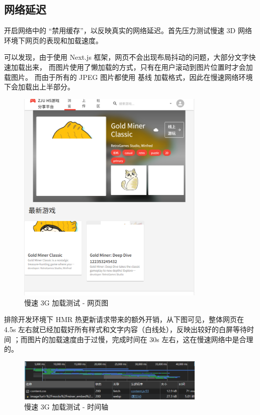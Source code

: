 \documentclass[12pt]{ctexart} %
\begin{document}
\subsection{网络延迟}

开启网络中的 “禁用缓存”，以反映真实的网络延迟。首先压力测试慢速 3D 网络环境下网页的表现和加载速度。

可以发现，由于使用 Next.js 框架，网页不会出现布局抖动的问题，大部分文字快速加载出来，
而图片使用了懒加载的方式，只有在用户滚动到图片位置时才会加载图片。
而由于所有的 JPEG 图片都使用 基线 加载格式，因此在慢速网络环境下会加载出上半部分。

\begin{figure}[H]
  \centering
  \includegraphics[width=0.8\textwidth]{front-page1.png}
  \caption{慢速 3G 加载测试 - 网页图}
\end{figure}

排除开发环境下 HMR 热更新请求带来的额外开销，从下图可见，整体网页在 4.5s 左右就已经加载好所有样式和文字内容（白线处），反映出较好的白屏等待时间
；而图片的加载速度由于过慢，完成时间在 30s 左右，这在慢速网络中是合理的。

\begin{figure}[H]
  \centering
  \includegraphics[width=0.8\textwidth]{front-page2.png}
  \caption{慢速 3G 加载测试 - 时间轴}
\end{figure}
\end{document}
